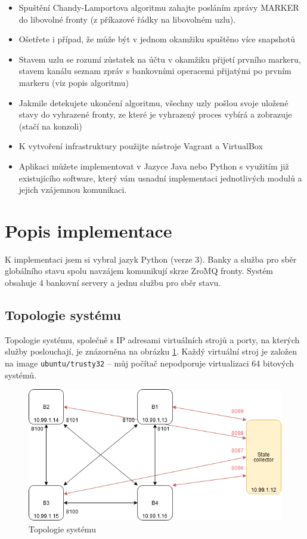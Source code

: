 \documentclass[11pt,a4paper]{scrartcl}
\begin{document}
\begin{itemize}
		\item Spuštění Chandy-Lamportova algoritmu zahajte posláním zprávy MARKER do libovolné fronty (z příkazové
		řádky na libovolném uzlu).

		\item Ošetřete i případ, že může být v jednom okamžiku spuštěno více snapshotů

		\item Stavem uzlu se rozumí zůstatek na účtu v okamžiku přijetí prvního markeru, stavem kanálu seznam zpráv s
		bankovními operacemi přijatými po prvním markeru (viz popis algoritmu)

		\item Jakmile detekujete ukončení algoritmu, všechny uzly pošlou svoje uložené stavy do vyhrazené fronty, ze které
		je vyhrazený proces vybírá a zobrazuje (stačí na konzoli)

		\item K vytvoření infrastruktury použijte nástroje Vagrant a VirtualBox

		\item Aplikaci můžete implementovat v Jazyce Java nebo Python s využitím již existujícího software, který vám
		usnadní implementaci jednotlivých modulů a jejich vzájemnou komunikaci.
	\end{itemize}
	
	
	
	\section{Popis implementace}
	K implementaci jsem si vybral jazyk Python (verze 3). Banky a služba pro sběr globálního stavu spolu navzájem komunikují skrze ZroMQ fronty. Systém obsahuje 4 bankovní servery a jednu službu pro sběr stavu.
	
	\subsection{Topologie systému}
	Topologie systému, společně s IP adresami virtuálních strojů a porty, na kterých služby poslouchají, je znázorněna na obrázku \ref{fig:topology}. Každý virtuální stroj je založen na image \verb|ubuntu/trusty32| -- můj počítač nepodporuje virtualizaci 64 bitových systémů. 
	
	\begin{figure}[H]
		\centering
		\includegraphics[width=15cm]{img/topologie.png}
		\caption{Topologie systému}
		\label{fig:topology}
	\end{figure}
\end{document}
